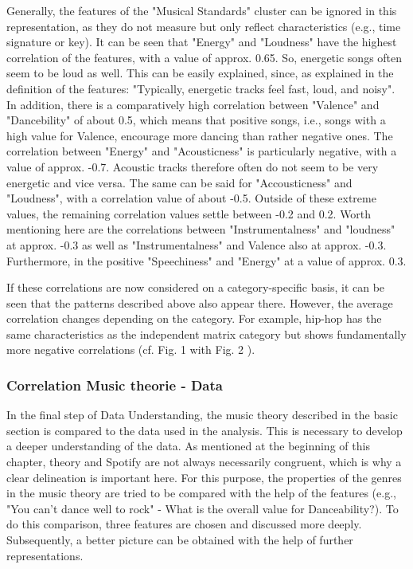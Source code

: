 Generally, the features of the "Musical Standards" cluster can be ignored in this representation,
as they do not measure but only reflect characteristics (e.g., time signature or key).
It can be seen that "Energy" and "Loudness" have the highest correlation of the features,
with a value of approx. 0.65.  So, energetic songs often seem to be loud as well.
This can be easily explained, since, as explained in the definition of the features:
"Typically, energetic tracks feel fast, loud, and noisy".
In addition, there is a comparatively high correlation between "Valence" and "Dancebility" of
about 0.5, which means that positive songs, i.e., songs with a high value for Valence,
encourage more dancing than rather negative ones. The correlation between "Energy" and "Acousticness"
is particularly negative, with a value of approx. -0.7.
Acoustic tracks therefore often do not seem to be very energetic and vice versa.
The same can be said for "Accousticness" and "Loudness", with a correlation value of about -0.5.
Outside of these extreme values, the remaining correlation values settle between -0.2 and 0.2.
Worth mentioning here are the correlations between "Instrumentalness" and "loudness" at
approx. -0.3 as well as "Instrumentalness" and Valence also at approx. -0.3. Furthermore,
in the positive "Speechiness" and "Energy" at a value of approx. 0.3.

If these correlations are now considered on a category-specific basis,
it can be seen that the patterns described above also appear there.
However, the average correlation changes depending on the category.
For example, hip-hop has the same characteristics as the independent matrix category but shows
fundamentally more negative correlations (cf. Fig. 1 with Fig. 2 ).

\subsubsection{Correlation Music theorie - Data}
In the final step of Data Understanding,
the music theory described in the basic section is compared to the data used in the analysis.
This is necessary to develop a deeper understanding of the data.
As mentioned at the beginning of this chapter, theory and Spotify are not always necessarily congruent,
which is why a clear delineation is important here.
For this purpose, the properties of the genres in the music theory are tried to be compared
with the help of the features (e.g., "You can't dance well to rock" - What is the overall value for Danceability?).
To do this comparison, three features are chosen and discussed more deeply.
Subsequently, a better picture can be obtained with the help of further representations.

